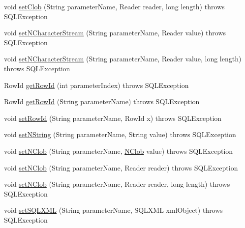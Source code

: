 \begin{DoxyCompactItemize}
\item 
void \mbox{\hyperlink{classcom_1_1mysql_1_1cj_1_1jdbc_1_1_callable_statement_a6ea81378f64a3c5addddf379adef7dff}{set\+Clob}} (String parameter\+Name, Reader reader, long length)  throws S\+Q\+L\+Exception 
\item 
void \mbox{\hyperlink{classcom_1_1mysql_1_1cj_1_1jdbc_1_1_callable_statement_af60f91b86793a9898354b76d75ab0867}{set\+N\+Character\+Stream}} (String parameter\+Name, Reader value)  throws S\+Q\+L\+Exception 
\item 
void \mbox{\hyperlink{classcom_1_1mysql_1_1cj_1_1jdbc_1_1_callable_statement_a0d7753d1fc9fa30f0f26d609ef503da0}{set\+N\+Character\+Stream}} (String parameter\+Name, Reader value, long length)  throws S\+Q\+L\+Exception 
\item 
Row\+Id \mbox{\hyperlink{classcom_1_1mysql_1_1cj_1_1jdbc_1_1_callable_statement_a8a45432648ac87e351ce860544fc93b3}{get\+Row\+Id}} (int parameter\+Index)  throws S\+Q\+L\+Exception 
\item 
Row\+Id \mbox{\hyperlink{classcom_1_1mysql_1_1cj_1_1jdbc_1_1_callable_statement_aecaec5ce03bfdda6b57a3373b0739f25}{get\+Row\+Id}} (String parameter\+Name)  throws S\+Q\+L\+Exception 
\item 
void \mbox{\hyperlink{classcom_1_1mysql_1_1cj_1_1jdbc_1_1_callable_statement_a9a486e03a6a47d24e474cd305f93e729}{set\+Row\+Id}} (String parameter\+Name, Row\+Id x)  throws S\+Q\+L\+Exception 
\item 
void \mbox{\hyperlink{classcom_1_1mysql_1_1cj_1_1jdbc_1_1_callable_statement_aafb9f5d4c8dd0ff100d2dd24b530a274}{set\+N\+String}} (String parameter\+Name, String value)  throws S\+Q\+L\+Exception 
\item 
void \mbox{\hyperlink{classcom_1_1mysql_1_1cj_1_1jdbc_1_1_callable_statement_a1ab3bcc87b0d60c29ce5eba3f6d0b19d}{set\+N\+Clob}} (String parameter\+Name, \mbox{\hyperlink{classcom_1_1mysql_1_1cj_1_1jdbc_1_1_n_clob}{N\+Clob}} value)  throws S\+Q\+L\+Exception 
\item 
void \mbox{\hyperlink{classcom_1_1mysql_1_1cj_1_1jdbc_1_1_callable_statement_ad4b6ab140e853c27e1582981665d925a}{set\+N\+Clob}} (String parameter\+Name, Reader reader)  throws S\+Q\+L\+Exception 
\item 
void \mbox{\hyperlink{classcom_1_1mysql_1_1cj_1_1jdbc_1_1_callable_statement_acec0c18ed673c688052f2b4aff9b3846}{set\+N\+Clob}} (String parameter\+Name, Reader reader, long length)  throws S\+Q\+L\+Exception 
\item 
void \mbox{\hyperlink{classcom_1_1mysql_1_1cj_1_1jdbc_1_1_callable_statement_a91114c0dd4622e91165da9db928725b3}{set\+S\+Q\+L\+X\+ML}} (String parameter\+Name, S\+Q\+L\+X\+ML xml\+Object)  throws S\+Q\+L\+Exception 

\end{DoxyCompactItemize}

